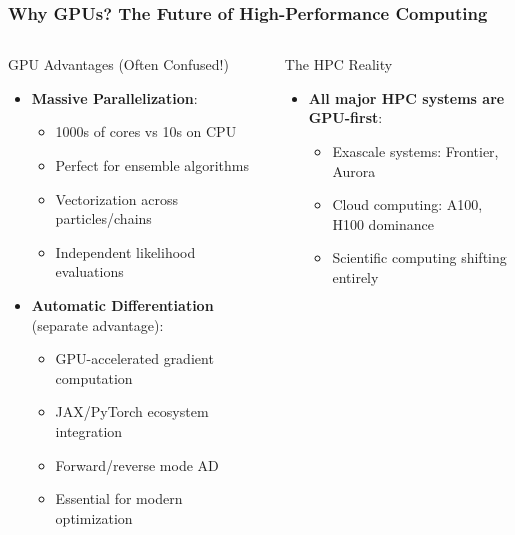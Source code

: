 \documentclass[aspectratio=169]{beamer}
\begin{document}
\begin{frame}
    \frametitle{Why GPUs? The Future of High-Performance Computing}
    \begin{columns}
        \begin{block}{GPU Advantages (Often Confused!)}
            \begin{itemize}
                \item \textbf{Massive Parallelization}:
                    \begin{itemize}
                        \item 1000s of cores vs 10s on CPU
                        \item Perfect for ensemble algorithms
                        \item Vectorization across particles/chains
                        \item Independent likelihood evaluations
                    \end{itemize}
                \item \textbf{Automatic Differentiation} (separate advantage):
                    \begin{itemize}
                        \item GPU-accelerated gradient computation
                        \item JAX/PyTorch ecosystem integration
                        \item Forward/reverse mode AD
                        \item Essential for modern optimization
                    \end{itemize}
            \end{itemize}
        \end{block}
        \begin{block}{The HPC Reality}
            \begin{itemize}
                \item \textbf{All major HPC systems are GPU-first}:
                    \begin{itemize}
                        \item Exascale systems: Frontier, Aurora
                        \item Cloud computing: A100, H100 dominance
                        \item Scientific computing shifting entirely
                    \end{itemize}

\end{itemize}
\end{block}
\end{columns}
\end{frame}
\end{document}
